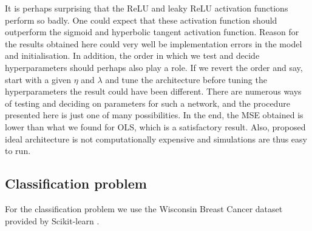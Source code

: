     It is perhaps surprising that the ReLU and leaky ReLU activation functions perform so badly. One could expect that these activation function should outperform the sigmoid and hyperbolic tangent activation function. Reason for the results obtained here could very well be implementation errors in the model and initialisation. In addition, the order in which we test and decide hyperparameters should perhaps also play a role. If we revert the order and say, start with a given $\eta$ and $\lambda$ and tune the architecture before tuning the hyperparameters the result could have been different. There are numerous ways of testing and deciding on parameters for such a network, and the procedure presented here is just one of many possibilities. In the end, the MSE obtained is lower than what we found for OLS, which is a satisfactory result. Also, proposed ideal architecture is not computationally expensive and simulations are thus easy to run. 

  






\subsection{Classification problem}\label{sec:analysis_classification}
    For the classification problem we use the Wisconsin Breast Cancer dataset provided by Scikit-learn \citep{scikit-learn}.


